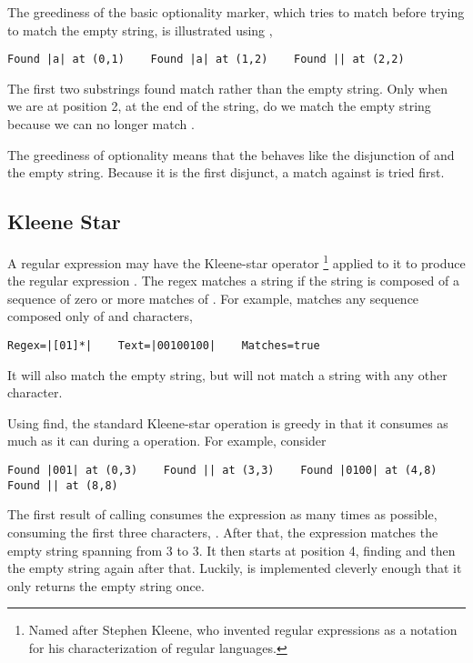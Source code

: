 The greediness of the basic optionality marker, which tries to match
before trying to match the empty string, is illustrated using
,
%
\begin{verbatim}
Found |a| at (0,1)    Found |a| at (1,2)    Found || at (2,2)
\end{verbatim}
%
The first two substrings found match  rather than
the empty string.  Only when we are at position 2, at the
end of the string, do we match the empty string because we
can no longer match .

The greediness of optionality means that the 
behaves like the disjunction  of  and
the empty string.  Because it is the first disjunct, a match
against  is tried first.


\subsection{Kleene Star}

A regular expression  may have the Kleene-star operator%
%
\footnote{Named after Stephen Kleene, who invented regular expressions
as a notation for his characterization of regular languages.}
%
applied to it to produce the regular expression \code{*}.
The regex \code{*} matches a string if the string is
composed of a sequence of zero or more matches of .  For
example, \code{[01]*} matches any sequence composed only of 
and  characters,
%
\begin{verbatim}
Regex=|[01]*|    Text=|00100100|    Matches=true
\end{verbatim}
%
It will also match the empty string, but will not match a string with
any other character.

Using find, the standard Kleene-star operation is greedy in that it
consumes as much as it can during a  operation.  For
example, consider
%
\begin{verbatim}
Found |001| at (0,3)    Found || at (3,3)    Found |0100| at (4,8)
Found || at (8,8)
\end{verbatim}
%
The first result of calling  consumes the expression
\code{[01]} as many times as possible, consuming the first three
characters, .  After that, the expression matches the empty
string spanning from 3 to 3.  It then starts at position 4, finding
 and then the empty string again after that.  Luckily,
 is implemented cleverly enough that it only returns the
empty string once.  

